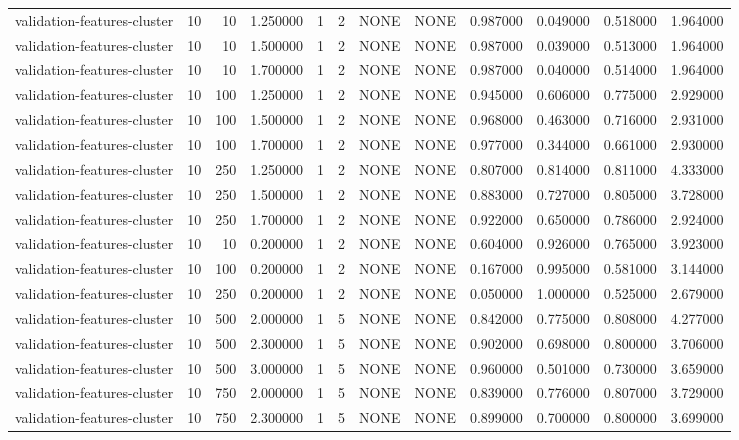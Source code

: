 \begin{tabular}{lrrrllllrrrr}
validation-features-cluster & 10 & 10 & 1.250000 & 1 & 2 & NONE & NONE & 0.987000 & 0.049000 & 0.518000 & 1.964000 \\
validation-features-cluster & 10 & 10 & 1.500000 & 1 & 2 & NONE & NONE & 0.987000 & 0.039000 & 0.513000 & 1.964000 \\
validation-features-cluster & 10 & 10 & 1.700000 & 1 & 2 & NONE & NONE & 0.987000 & 0.040000 & 0.514000 & 1.964000 \\
validation-features-cluster & 10 & 100 & 1.250000 & 1 & 2 & NONE & NONE & 0.945000 & 0.606000 & 0.775000 & 2.929000 \\
validation-features-cluster & 10 & 100 & 1.500000 & 1 & 2 & NONE & NONE & 0.968000 & 0.463000 & 0.716000 & 2.931000 \\
validation-features-cluster & 10 & 100 & 1.700000 & 1 & 2 & NONE & NONE & 0.977000 & 0.344000 & 0.661000 & 2.930000 \\
validation-features-cluster & 10 & 250 & 1.250000 & 1 & 2 & NONE & NONE & 0.807000 & 0.814000 & 0.811000 & 4.333000 \\
validation-features-cluster & 10 & 250 & 1.500000 & 1 & 2 & NONE & NONE & 0.883000 & 0.727000 & 0.805000 & 3.728000 \\
validation-features-cluster & 10 & 250 & 1.700000 & 1 & 2 & NONE & NONE & 0.922000 & 0.650000 & 0.786000 & 2.924000 \\
validation-features-cluster & 10 & 10 & 0.200000 & 1 & 2 & NONE & NONE & 0.604000 & 0.926000 & 0.765000 & 3.923000 \\
validation-features-cluster & 10 & 100 & 0.200000 & 1 & 2 & NONE & NONE & 0.167000 & 0.995000 & 0.581000 & 3.144000 \\
validation-features-cluster & 10 & 250 & 0.200000 & 1 & 2 & NONE & NONE & 0.050000 & 1.000000 & 0.525000 & 2.679000 \\
validation-features-cluster & 10 & 500 & 2.000000 & 1 & 5 & NONE & NONE & 0.842000 & 0.775000 & 0.808000 & 4.277000 \\
validation-features-cluster & 10 & 500 & 2.300000 & 1 & 5 & NONE & NONE & 0.902000 & 0.698000 & 0.800000 & 3.706000 \\
validation-features-cluster & 10 & 500 & 3.000000 & 1 & 5 & NONE & NONE & 0.960000 & 0.501000 & 0.730000 & 3.659000 \\
validation-features-cluster & 10 & 750 & 2.000000 & 1 & 5 & NONE & NONE & 0.839000 & 0.776000 & 0.807000 & 3.729000 \\
validation-features-cluster & 10 & 750 & 2.300000 & 1 & 5 & NONE & NONE & 0.899000 & 0.700000 & 0.800000 & 3.699000 \\

\end{tabular}
